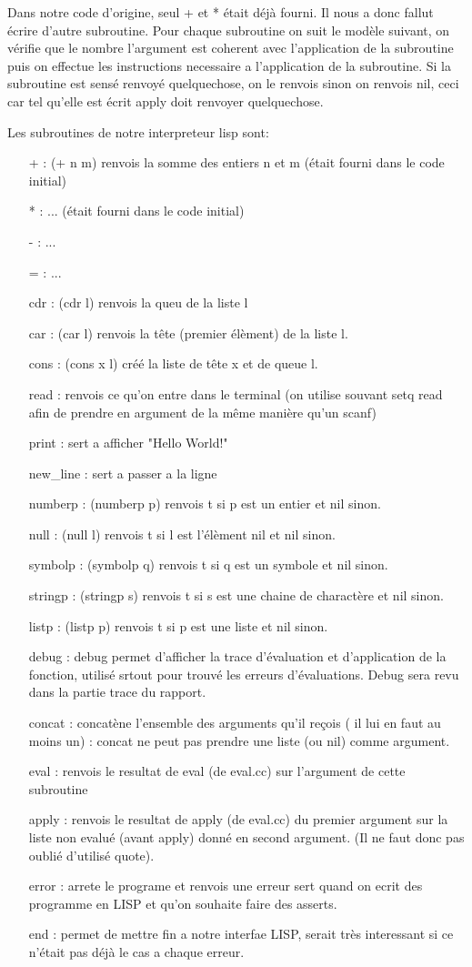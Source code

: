 \documentclass[a4paper,11pt]{article}
\begin{document}
	Dans notre code d'origine, seul + et * était déjà fourni. Il nous a donc fallut écrire d'autre subroutine. Pour chaque subroutine on suit le modèle suivant, on vérifie que le nombre l'argument est coherent avec l'application de la subroutine puis on effectue les instructions necessaire a l'application de la subroutine. Si la subroutine est sensé renvoyé quelquechose, on le renvois sinon on renvois nil, ceci car tel qu'elle est écrit apply doit renvoyer quelquechose.


Les subroutines de notre interpreteur lisp sont:
\begin{itemize}
	\item[+] : (+ n m) renvois la somme des entiers n et m (était fourni dans le code initial)
	\item[*] : ... (était fourni dans le code initial)
	\item[-] : ...
	\item[=] : ...
	\item[cdr] : (cdr l) renvois la queu de la liste l
	\item[car] : (car l) renvois la tête (premier élèment) de la liste l.
	\item[cons] : (cons x l) créé la liste de tête x et de queue l.
	\item[read] : renvois ce qu'on entre dans le terminal (on utilise souvant setq read afin de prendre en argument de la même manière qu'un scanf)
	\item[print] : sert a afficher "Hello World!"
	\item[new\_line] : sert a passer a la ligne
	\item[numberp] : (numberp p) renvois t si p est un entier et nil sinon.
	\item[null] : (null l) renvois t si l est l'élèment nil et nil sinon.	
	\item[symbolp] : (symbolp q) renvois t si q est un symbole et nil sinon.
	\item[stringp] : (stringp s) renvois t si s est une chaine de charactère et nil sinon.
	\item[listp] : (listp p) renvois t si p est une liste et nil sinon.
	\item[debug] : debug permet d'afficher la trace d'évaluation et d'application de la fonction, utilisé srtout pour trouvé les erreurs d'évaluations. Debug sera revu dans la partie trace du rapport.
	\item[concat] : concatène l'ensemble des arguments qu'il reçois ( il lui en faut au moins un) : concat ne peut pas prendre une liste (ou nil) comme argument.
	\item[eval] : renvois le resultat de eval (de eval.cc) sur l'argument de cette subroutine
	\item[apply] : renvois le resultat de apply (de eval.cc) du premier argument sur la liste non evalué (avant apply) donné en second argument. (Il ne faut donc pas oublié d'utilisé quote).
	\item[error] : arrete le programe et renvois une erreur sert quand on ecrit des programme en LISP et qu'on souhaite faire des asserts.
	\item[end] : permet de mettre fin a notre interfae LISP, serait très interessant si ce n'était pas déjà le cas a chaque erreur.
	

\end{itemize}
\end{document}

